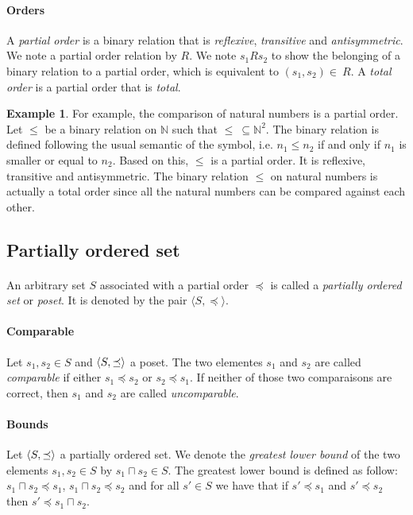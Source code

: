 \documentclass[letterpaper]{article}
\DeclarePairedDelimiter{\tuple}{\langle}{\rangle}
\theoremstyle{definition}
\newtheorem{example}{Example}[subsection]
\begin{document}
\paragraph{Orders}

A \textit{partial order} is a binary relation that is \textit{reflexive},
\textit{transitive} and \textit{antisymmetric}. We note a
partial order relation by $R$.
We note $s_1 R  s_2$ to show the belonging of
a binary relation to a partial order, which is equivalent
to $(s_1, s_2) \in \ R$.
A \textit{total order} is a partial order that is \textit{total}.

\begin{example}

For example, the comparison of natural numbers is a partial order.
Let $\leq$ be a binary relation on $\mathbb{N}$
such that $\leq \ \subseteq \mathbb{N}^2$. The binary relation is defined
following the usual semantic of the symbol, i.e. $n_1 \leq n_2$ if and
only if $n_1$ is smaller or equal to $n_2$.
Based on this, $\leq$ is a partial order. It is
reflexive, transitive and antisymmetric.
The binary relation $\leq$ on natural numbers is actually a total
order since all the natural numbers can be compared against each other.

\end{example}

\subsection{Partially ordered set}

\paragraph{}

An arbitrary set $S$ associated with a partial order $\preceq$
is called a \textit{partially ordered set} or \textit{poset}.
It is denoted by the pair $\langle S, \preceq \rangle$.

\paragraph{Comparable}

Let $s_1, s_2 \in S$ and $\tuple{S, \preceq}$ a poset.
The two elementes $s_1$ and $s_2$ are called \textit{comparable} if either
$s_1 \preceq s_2$ or $s_2 \preceq s_1$. If neither of those two comparaisons
are correct, then $s_1$ and $s_2$ are called \textit{uncomparable}.


\paragraph{Bounds} Let $\tuple{S, \preceq}$ a partially ordered set.
We denote the \textit{greatest lower bound} of the two elements $s_1,
s_2 \in S$
by $s_1 \sqcap s_2 \in S$.
The greatest lower bound is defined as follow:
$s_1 \sqcap s_2 \preceq s_1$,
$s_1 \sqcap s_2 \preceq s_2$ and for all $s' \in S$ we have that
if $s' \preceq s_1$ and $s' \preceq s_2$ then $s' \preceq s_1 \sqcap s_2$.
\end{document}
